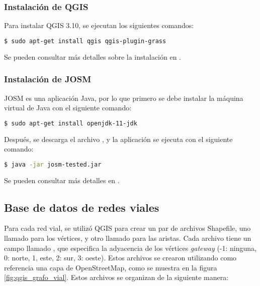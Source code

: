 \subsubsection{Instalación de QGIS}
\label{subsubsec:instalacion_qgis}

Para instalar QGIS 3.10, se ejecutan los siguientes comandos:

\begin{lstlisting}[language=bash]
$ sudo apt-get install qgis qgis-plugin-grass
\end{lstlisting}

Se pueden consultar más detalles sobre la instalación en
\cite{InstalacionQGIS}.

\subsubsection{Instalación de JOSM}
\label{subsubsec:instalacion_josm}

JOSM es una aplicación Java, por lo que primero se debe instalar la máquina
virtual de Java con el siguiente comando:

\begin{lstlisting}[language=bash]
$ sudo apt-get install openjdk-11-jdk
\end{lstlisting}

Después, se descarga el archivo
\href{https://josm.openstreetmap.de/wiki/Download}{}, y
la aplicación se ejecuta con el siguiente comando:

\begin{lstlisting}[language=bash]
$ java -jar josm-tested.jar
\end{lstlisting}

Se pueden consultar más detalles en \cite{DescargaJOSM}.

\subsection{Base de datos de redes viales}
\label{subsec:creacion_base_de_la_datos_de_redes_viales}

Para cada red vial, se utilizó QGIS para crear un par de archivos Shapefile, uno
llamado  para los vértices, y otro llamado 
para las aristas. Cada archivo  tiene un campo llamado
, que especifica la adyacencia de los vértices \textit{gateway}
(-1: ninguna, 0: norte, 1, este, 2: sur, 3: oeste). Estos archivos se crearon
utilizando como referencia una capa de OpenStreetMap, como se muestra en la
figura \ref{fig:qgis_grafo_vial}. Estos archivos se organizan de la siguiente
manera:

